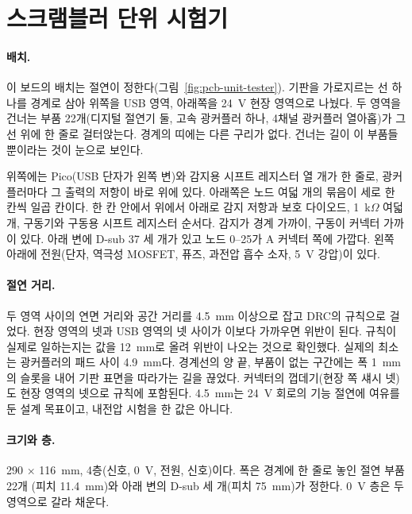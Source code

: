 
\section{스크램블러 단위 시험기}\label{pcb:unit-tester}

\paragraph{배치.} 이 보드의 배치는 절연이 정한다(그림~\ref{fig:pcb-unit-tester}). 기판을 가로지르는 선 하나를
경계로 삼아 위쪽을 USB 영역, 아래쪽을 24~V 현장 영역으로 나눴다. 두 영역을 건너는 부품 22개(디지털 절연기
둘, 고속 광커플러 하나, 4채널 광커플러 열아홉)가 그 선 위에 한 줄로 걸터앉는다. 경계의 띠에는 다른 구리가
없다. 건너는 길이 이 부품들뿐이라는 것이 눈으로 보인다.

위쪽에는 Pico(USB 단자가 왼쪽 변)와 감지용 시프트 레지스터 열 개가 한 줄로, 광커플러마다 그 출력의 저항이
바로 위에 있다. 아래쪽은 노드 여덟 개의 묶음이 세로 한 칸씩 일곱 칸이다. 한 칸 안에서 위에서 아래로 감지 저항과
보호 다이오드, 1~k$\Omega$ 여덟 개, 구동기와 구동용 시프트 레지스터 순서다. 감지가 경계 가까이, 구동이 커넥터
가까이 있다. 아래 변에 D-sub 37 세 개가 있고 노드 0--25가 A 커넥터 쪽에 가깝다. 왼쪽 아래에 전원(단자, 역극성
MOSFET, 퓨즈, 과전압 흡수 소자, 5~V 강압)이 있다.

\paragraph{절연 거리.} 두 영역 사이의 연면 거리와 공간 거리를 4.5~mm 이상으로 잡고 DRC의 규칙으로 걸었다.
현장 영역의 넷과 USB 영역의 넷 사이가 이보다 가까우면 위반이 된다. 규칙이 실제로 일하는지는 값을 12~mm로
올려 위반이 나오는 것으로 확인했다. 실제의 최소는 광커플러의 패드 사이 4.9~mm다. 경계선의 양 끝, 부품이 없는
구간에는 폭 1~mm의 슬롯을 내어 기판 표면을 따라가는 길을 끊었다. 커넥터의 껍데기(현장 쪽 섀시 넷)도 현장 영역의
넷으로 규칙에 포함된다. 4.5~mm는 24~V 회로의 기능 절연에 여유를 둔 설계 목표이고, 내전압 시험을 한 값은 아니다.

\paragraph{크기와 층.} 290 × 116~mm, 4층(신호, 0~V, 전원, 신호)이다. 폭은 경계에 한 줄로 놓인 절연 부품 22개
(피치 11.4~mm)와 아래 변의 D-sub 세 개(피치 75~mm)가 정한다. 0~V 층은 두 영역으로 갈라 채운다.

